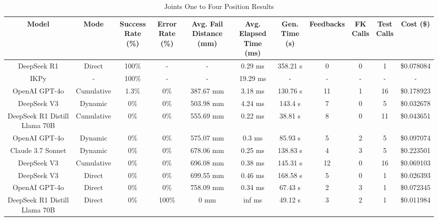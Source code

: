 \begin{landscape}
\begin{table}[H]
\tiny
\renewcommand{\arraystretch}{1.2}
\caption{Joints One to Four Position Results}
\begin{center}
\begin{tabular}{|c|c|c|c|c|c|c|c|c|c|c|}
    \hline
    \textbf{Model} & 
    \textbf{Mode} & 
    \makecell{\textbf{Success}\\\textbf{Rate (\%)}} &
    \makecell{\textbf{Error}\\\textbf{Rate (\%)}} &
    \makecell{\textbf{Avg. Fail}\\\textbf{Distance (mm)}} &
    \makecell{\textbf{Avg. Elapsed}\\\textbf{Time (ms)}} &
    \makecell{\textbf{Gen.}\\\textbf{Time (s)}} &
    \textbf{Feedbacks} &
    \makecell{\textbf{FK}\\\textbf{Calls}} &
    \makecell{\textbf{Test}\\\textbf{Calls}} &
    \textbf{Cost (\$)} \\
    \hline
    DeepSeek R1 & Direct & 100\% & - & - & 0.29 ms & 358.21 s & 0 & 0 & 1 & \$0.078084 \\
    \hline
    IKPy & - & 100\% & - & - & 19.29 ms & - & - & - & - & - \\
    \hline
    OpenAI GPT-4o & Cumulative & 1.3\% & 0\% & 387.67 mm & 3.18 ms & 130.76 s & 11 & 1 & 16 & \$0.178923 \\
    \hline
    DeepSeek V3 & Dynamic & 0\% & 0\% & 503.98 mm & 4.24 ms & 143.4 s & 7 & 0 & 5 & \$0.032678 \\
    \hline
    DeepSeek R1 Distill Llama 70B & Cumulative & 0\% & 0\% & 555.69 mm & 0.22 ms & 38.81 s & 8 & 0 & 11 & \$0.043651 \\
    \hline
    OpenAI GPT-4o & Dynamic & 0\% & 0\% & 575.07 mm & 0.3 ms & 85.93 s & 5 & 2 & 5 & \$0.097074 \\
    \hline
    Claude 3.7 Sonnet & Dynamic & 0\% & 0\% & 678.06 mm & 0.25 ms & 138.83 s & 4 & 3 & 5 & \$0.223501 \\
    \hline
    DeepSeek V3 & Cumulative & 0\% & 0\% & 696.08 mm & 0.38 ms & 145.31 s & 12 & 0 & 16 & \$0.069103 \\
    \hline
    DeepSeek V3 & Direct & 0\% & 0\% & 699.55 mm & 0.46 ms & 168.58 s & 5 & 0 & 1 & \$0.026393 \\
    \hline
    OpenAI GPT-4o & Direct & 0\% & 0\% & 758.09 mm & 0.34 ms & 67.43 s & 2 & 3 & 1 & \$0.072345 \\
    \hline
    DeepSeek R1 Distill Llama 70B & Direct & 0\% & 100\% & 0 mm & inf ms & 49.12 s & 3 & 2 & 1 & \$0.011984 \\
    \hline
\end{tabular}
\label{Results-Position-1-4}
\end{center}
\end{table}


\end{landscape}
